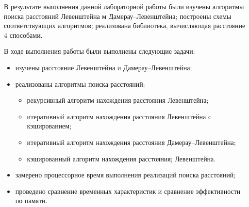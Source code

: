 \Conclusion %

В результате выполнения данной лабораторной работы были изучены алгоритмы поиска расстояний Левенштейна м Дамерау--Левенштейна; построены схемы соответствующих алгоритмов; реализована библиотека, вычисляющая расстояние 4 способами.


В ходе выполнения работы были выполнены следующие задачи:
\begin{itemize} 
    \item изучены расстояние Левенштейна и Дамерау--Левенштейна;
    \item реализованы алгоритмы поиска расстояний:
    \begin{itemize}
        \item рекурсивный алгоритм нахождения расстояния Левенштейна;
        \item итеративный алгоритм нахождения расстояния Левенштейна с кэшированием;
        \item итеративный алгоритм нахождения расстояния Дамерау--Левенштейна;
        \item кэшированный алгоритм нахождения расстояния; Левенштейна.
    \end{itemize}
    \item  замерено процессорное время выполнения реализаций поиска расстояний;
    \item проведено сравнение временных характеристик и сравнение эффективности по памяти.
\end{itemize}


